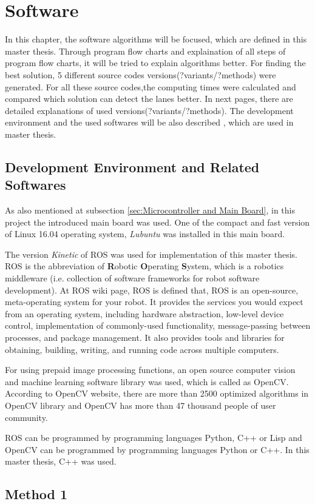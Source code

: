 %
\section{Software}\label{sec:Software}


In this chapter, the software algorithms will be focused, which are defined in this master thesis.  Through program flow charts and explaination of all steps of program flow charts, it will be tried to explain algorithms better. For finding the best solution, 5 different source codes versions(?variants/?methods) were generated. For all these source codes,the computing times were calculated and compared which solution can detect the lanes better. In next pages, there are detailed explanations of used versions(?variants/?methods). The development environment and the used softwares will be also described , which are used in master thesis.

\subsection{Development Environment and Related Softwares}
\label{sec:Development Environment and Related Softwares}

As also mentioned at subsection \ref{sec:Microcontroller and Main Board}, in this project the introduced main board was used. One of the compact and fast version of Linux 16.04 operating system, \textit{Lubuntu} was installed in this main board.

The version \textit{Kinetic} of ROS was used for implementation of this master thesis. ROS is the abbreviation of \textbf{R}obotic \textbf{O}perating \textbf{S}ystem, which is a robotics middleware (i.e. collection of software frameworks for robot software development). At ROS wiki page\cite{ROS}, ROS is defined that, ROS is an open-source, meta-operating system for your robot. It provides the services you would expect from an operating system, including hardware abstraction, low-level device control, implementation of commonly-used functionality, message-passing between processes, and package management. It also provides tools and libraries for obtaining, building, writing, and running code across multiple computers.

For using prepaid image processing functions, an open source computer vision and machine learning software library was used, which is called as OpenCV. According to OpenCV website\cite{OpenCV}, there are more than 2500 optimized algorithms in OpenCV library and OpenCV has more than 47 thousand people of user community.

ROS can be programmed by programming languages Python, C++ or Lisp and OpenCV can be programmed by programming languages Python or C++. In this master thesis, C++ was used.

\subsection{Method 1}\label{sec:Method 1}




 
%


